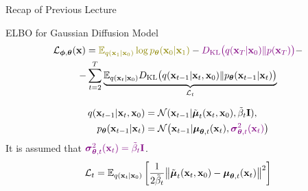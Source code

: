\documentclass{beamer}
\begin{document}
\begin{frame}
\titlepage
    \resetonslide
\end{frame}
\begin{frame}{Recap of Previous Lecture}
	\begin{block}{ELBO for Gaussian Diffusion Model}
		\vspace{-0.7cm}
		\begin{multline*}
			\cL_{\bphi, \btheta}(\bx) =  {\color{olive}\bbE_{q(\bx_1 | \bx_0)} \log \pt(\bx_0 | \bx_1)} - {\color{violet}\KL\bigl(q(\bx_T | \bx_0) \| p(\bx_T)\bigr)} - \\
			- \sum_{t=2}^T  \underbrace{ \bbE_{q(\bx_t | \bx_0)}\KL \bigl(q(\bx_{t-1} | \bx_t, \bx_0) \| \pt(\bx_{t-1} | \bx_t)\bigr)}_{\cL_t}
		\end{multline*}
		\vspace{-1.0cm}
	\end{block}
	\begin{align*}
		q(\mathbf{x}_{t-1} | \mathbf{x}_t, \mathbf{x}_0) &= \mathcal{N}(\mathbf{x}_{t-1} | \tilde{\boldsymbol{\mu}}_t(\mathbf{x}_t, \mathbf{x}_0), \tilde{\beta}_t \mathbf{I}), \\
		p_{\boldsymbol{\theta}}(\mathbf{x}_{t - 1} | \mathbf{x}_t) &= \mathcal{N} \bigl(\mathbf{x}_{t - 1} | \boldsymbol{\mu}_{\boldsymbol{\theta}, t}(\mathbf{x}_t), {\color{violet}\boldsymbol{\sigma}_{\boldsymbol{\theta}, t}^2(\mathbf{x}_t)}\bigr)
	\end{align*}
	It is assumed that ${\color{violet}\boldsymbol{\sigma}_{\boldsymbol{\theta}, t}^2(\mathbf{x}_t) = \tilde{\beta}_t \mathbf{I}}$.
	\[
		\mathcal{L}_t = \mathbb{E}_{q(\mathbf{x}_t | \mathbf{x}_0)} \left[\frac{1}{2\tilde{\beta}_t} \bigl\| \tilde{\boldsymbol{\mu}}_t(\mathbf{x}_t, \mathbf{x}_0) - \boldsymbol{\mu}_{\boldsymbol{\theta}, t}(\mathbf{x}_t) \bigr\|^2  \right]
	\]
\end{frame}
\end{document}
